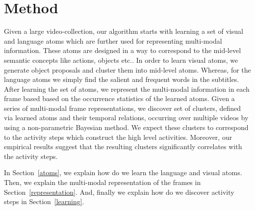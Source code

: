 \section{Method}
\label{sec:overview}


Given a large video-collection, our algorithm starts with learning a set of visual and language atoms which are further used for representing multi-modal information. These atoms are designed in a way to correspond to the mid-level semantic concepts like actions, objects etc.. In order to learn visual atoms, we generate object proposals and cluster them into mid-level atoms. Whereas, for the language atoms we simply find the salient and frequent words in the subtitles. After learning the set of atoms, we represent the multi-modal information in each frame based based on the occurrence statistics of the learned atoms. Given a series of multi-modal frame representations, we discover set of clusters, defined via learned atoms and their temporal relations, occurring over multiple videos by using a non-parametric Bayesian method. We expect these clusters to correspond to the activity steps which construct the high level activities. Moreover, our empirical results suggest that the resulting clusters significantly correlates with the activity steps.

In Section~\ref{atoms}, we explain how do we learn the language and visual atoms. Then, we explain the multi-modal representation of the frames in Section~\ref{representation}. And, finally we explain how do we discover activity steps in Section~\ref{learning}.



